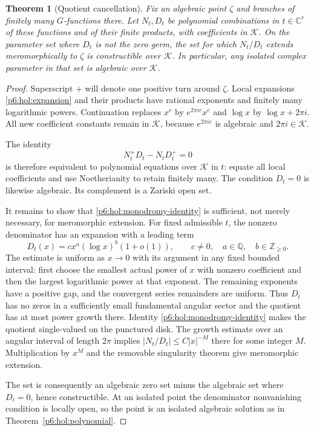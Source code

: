 \documentclass[11pt,a4paper]{article}
\newtheorem{theorem}{Theorem}[section]
\theoremstyle{definition}
\theoremstyle{remark}
\numberwithin{equation}{section}
\begin{document}
\begin{theorem}[Quotient cancellation]\label{p6:hol:quotient}
Fix an algebraic point $\zeta$ and branches of finitely many
$G$-functions there.  Let $N_t,D_t$ be polynomial combinations
in $t\in\mathbb C^r$ of these functions and of their finite
products, with coefficients in $\mathcal K$.  On the parameter
set where $D_t$ is not the zero germ, the set for which $N_t/D_t$
extends meromorphically to $\zeta$ is constructible over
$\mathcal K$.  In particular, any isolated complex parameter
in that set is algebraic over $\mathcal K$.
\end{theorem}
\begin{proof}
Superscript $+$ will denote one positive turn around $\zeta$.
Local expansions \eqref{p6:hol:expansion} and their products have
rational exponents and finitely many logarithmic powers.
Continuation replaces $x^e$ by $e^{2\pi ie}x^e$ and $\log x$
by $\log x+2\pi i$.  All new coefficient constants remain in
$\mathcal K$, because $e^{2\pi ie}$ is algebraic and
$2\pi i\in\mathcal K$.

The identity
\begin{equation}\label{p6:hol:monodromy-identity}
 N_t^+D_t-N_tD_t^+=0
\end{equation}
is therefore equivalent to polynomial equations over
$\mathcal K$ in $t$: equate all local coefficients and use
Noetherianity to retain finitely many.  The condition $D_t=0$
is likewise algebraic.  Its complement is a Zariski open set.

It remains to show that \eqref{p6:hol:monodromy-identity} is
sufficient, not merely necessary, for meromorphic extension.
For fixed admissible $t$, the nonzero denominator has an
expansion with a leading term
\[
 D_t(x)=c x^a(\log x)^b(1+o(1)),\qquad
 c\ne0,\quad a\in\mathbb Q,\quad b\in\mathbb Z_{\geq0}.
\]
The estimate is uniform as $x\to0$ with its argument in any
fixed bounded interval: first choose the smallest actual power
of $x$ with nonzero coefficient and then the largest logarithmic
power at that exponent.  The remaining exponents have a
positive gap, and the convergent series remainders are uniform.
Thus $D_t$ has no zeros in a sufficiently small fundamental
angular sector and the quotient has at most power growth there.
Identity \eqref{p6:hol:monodromy-identity} makes the quotient
single-valued on the punctured disk.  The growth estimate over
an angular interval of length $2\pi$ implies
$|N_t/D_t|\leq C|x|^{-M}$ there for some integer $M$.
Multiplication by $x^M$ and the removable singularity theorem
give meromorphic extension.

The set is consequently an algebraic zero set minus the
algebraic set where $D_t=0$, hence constructible.  At an
isolated point the denominator nonvanishing condition is
locally open, so the point is an isolated algebraic solution
as in Theorem~\ref{p6:hol:polynomial}.
\end{proof}
\end{document}
